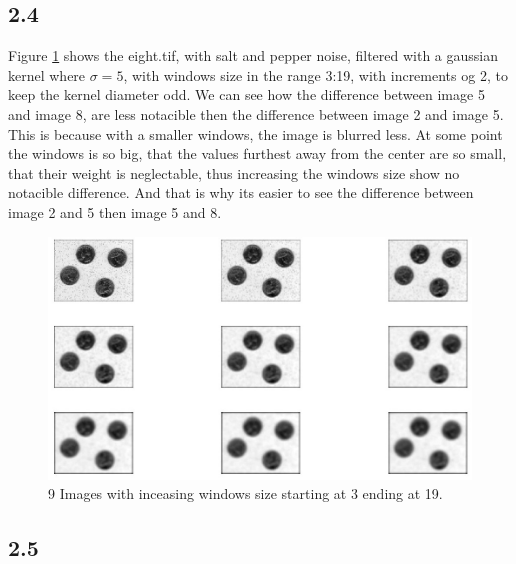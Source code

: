 \documentclass[11pt]{report}
\begin{document}
\subsection{2.4}
Figure \ref{fig:2_4} shows the eight.tif, with salt and pepper noise, filtered with a gaussian kernel where $\sigma = 5$, with windows size in the range 3:19, with increments og 2, to keep the kernel diameter odd. We can see how the difference between image 5 and image 8, are less notacible then the difference between image 2 and image 5. This is because with a smaller windows, the image is blurred less. At some point the windows is so big, that the values furthest away from the center are so small, that their weight is neglectable, thus increasing the windows size show no notacible difference. And that is why its easier to see the difference between image 2 and 5 then image 5 and 8.

\begin{figure}[!ht]
    \centering
    \includegraphics[width=1\textwidth]{fig24.jpg}
    \caption{9 Images with inceasing windows size starting at 3 ending at 19.}
    \label{fig:2_4}
\end{figure}



\subsection{2.5}
\end{document}
